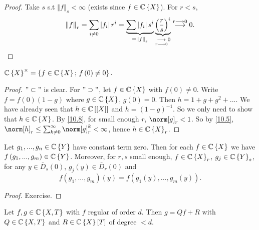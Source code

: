 \begin{proof}
Take $s$ s.t $\left\Vert f\right\Vert _{s}<\infty$ (exists since
$f\in\mathbb{C}\left\{ X\right\} $). For $r<s$, 
\[
\left\Vert f\right\Vert _{r}=\sum_{i\neq0}\left|f_{i}\right|r^{i}=\underbrace{\sum\left|f_{i}\right|s^{i}}_{=\left\Vert f\right\Vert _{s}}\underbrace{\left(\frac{r}{s}\right)^{i}}_{\underset{r\longrightarrow0}{\longrightarrow}0}\overset{r\longrightarrow0}{\longrightarrow}0.
\]
\end{proof}
\begin{cor*}
\label{10.9} $\mathbb{C}\left\{ X\right\} ^{\times}=\left\{ f\in\mathbb{C}\left\{ X\right\} ;\, f\left(0\right)\neq0\right\} $.\end{cor*}
\begin{proof}
$"\subset"$ is clear. For $"\supset"$, let $f\in\mathbb{C}\left\{ X\right\} $
with $f\left(0\right)\neq0$. Write $f=f\left(0\right)\left(1-g\right)$
where $g\in\mathbb{C}\left\{ X\right\} $, $g\left(0\right)=0$. Then $h=1+g+g^{2}+...$.
We have already seen that $h\in\mathbb{C}\left[\left[X\right]\right]$ and
$h=\left(1-g\right)^{-1}$. So we only need to show that $h\in\mathbb{C}\left\{ X\right\} $.
By \ref{10.8}, for small enough $r$, $\norm[g]_{r}<1$. So by \ref{10.5},
$\norm[h]_{r}\leq\sum_{k\neq0}^{\infty}\norm[g]_{r}^{k}<\infty$,
hence $h\in\mathbb{C}\left\{ X\right\} _{r}$.\end{proof}
\begin{lem*}
\label{10.10} Let $g_{1},...,g_{n}\in\mathbb{C}\left\{ Y\right\} $ have constant
term zero. Then for each $f\in\mathbb{C}\left\{ X\right\} $ we have $f\left(g_{1},...,g_{m}\right)\in\mathbb{C}\left\{ Y\right\} $.
Moreover, for $r,s$ small enough, $f\in\mathbb{C}\left\{ X\right\} _{r}$,
$g_{j}\in\mathbb{C}\left\{ Y\right\} _{s}$, for any $y\in\bar{D}_{s}\left(0\right)$,
$g_{j}\left(y\right)\in\bar{D}_{r}\left(0\right)$ and
\[
f\left(g_{1},...,g_{m}\right)\left(y\right)=f\left(g_{1}\left(y\right),...,g_{m}\left(y\right)\right).
\]
\end{lem*}
\begin{proof}
Exercise.\end{proof}
\begin{thm*}
\label{10.11} Let $f,g\in\mathbb{C}\left\{ X,T\right\} $ with $f$ regular of order
$d$. Then $g=Qf+R$ with $Q\in\mathbb{C}\left\{ X,T\right\} $ and $R\in\mathbb{C}\left\{ X\right\} \left[T\right]$
of degree $<d$.\end{thm*}
